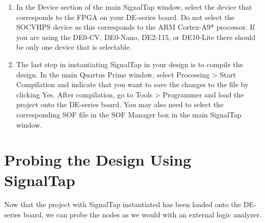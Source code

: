 \documentclass[11pt, twoside, pdftex]{article}
\begin{document}
\begin{enumerate}
\item In the Device section of the main SignalTap window, select the device that corresponds to the FPGA on your DE-series board.
Do not select the {\sf SOCVHPS} device as this corresponds to the ARM Cortex-A9* processor.
If you are using the DE0-CV, DE0-Nano, DE2-115, or DE10-Lite there should be only one device that is selectable.
\item The last step in instantiating SignalTap in your design is to compile the design. In the main Quartus Prime window,
select {\sf Processing > Start Compilation} and indicate that you want to save the changes to the file by clicking {\sf Yes}.
After compilation, go to {\sf Tools > Programmer} and load
the project onto the DE-series board. You may also need to select the corresponding SOF file in the SOF Manager box in the main SignalTap window.
\end{enumerate}

\section{Probing the Design Using SignalTap}

Now that the project with SignalTap instantiated has been loaded onto the DE-series board, we can
probe the nodes as we would with an external logic analyzer.
\end{document}
